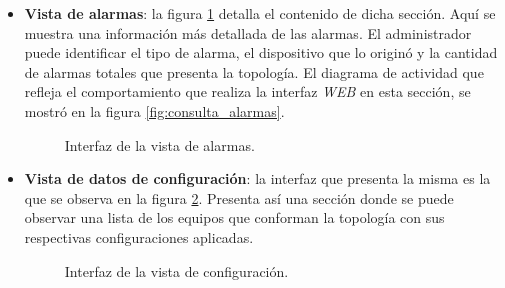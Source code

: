 \begin{itemize}
    \item \textbf{Vista de alarmas}:  la figura \ref{fig:captura_web_alarmas} detalla el contenido de dicha sección. Aquí se muestra una información más detallada de las alarmas. El administrador puede identificar el tipo de alarma, el dispositivo que lo originó y la cantidad de alarmas totales que presenta la topología. El diagrama de actividad que refleja el comportamiento que realiza la interfaz \textit{WEB} en esta sección, se mostró en la figura \ref{fig:consulta_alarmas}.
   
    \begin{figure}[H]
        \centering
        \caption{Interfaz de la vista de alarmas.}
        \label{fig:captura_web_alarmas}
      \end{figure}
    
    \item \textbf{Vista de datos de configuración}: la interfaz que presenta la misma es la que se observa en la figura \ref{fig:captura_web_config}. Presenta así una sección donde se puede observar una lista de los equipos que conforman la topología con sus respectivas configuraciones aplicadas. 
        
    \begin{figure}[H]
        \centering
        \caption{Interfaz de la vista de configuración.}
        \label{fig:captura_web_config}
      \end{figure}


\end{itemize}
